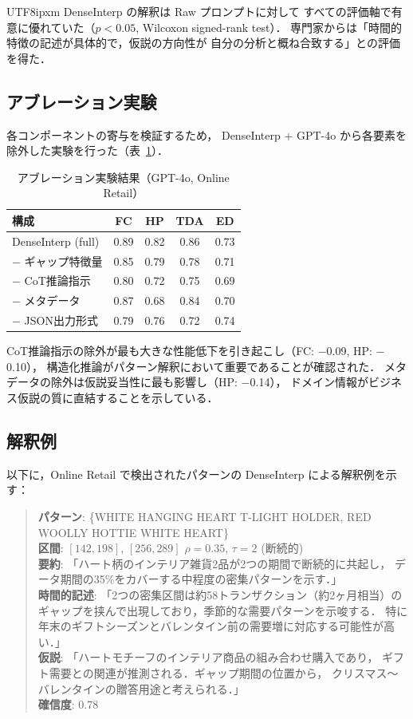 \documentclass[conference]{IEEEtran}
\begin{document}
\begin{CJK}{UTF8}{ipxm}
DenseInterp の解釈は Raw プロンプトに対して
すべての評価軸で有意に優れていた（$p < 0.05$, Wilcoxon signed-rank test）．
専門家からは「時間的特徴の記述が具体的で，仮説の方向性が
自分の分析と概ね合致する」との評価を得た．

\subsection{アブレーション実験}

各コンポーネントの寄与を検証するため，
DenseInterp + GPT-4o から各要素を除外した実験を行った（表~\ref{tab:ablation}）．

\begin{table}[t]
\centering
\caption{アブレーション実験結果（GPT-4o, Online Retail）}
\label{tab:ablation}
\begin{tabular}{lcccc}
\toprule
構成 & FC & HP & TDA & ED \\
\midrule
DenseInterp (full) & 0.89 & 0.82 & 0.86 & 0.73 \\
$-$ ギャップ特徴量 & 0.85 & 0.79 & 0.78 & 0.71 \\
$-$ CoT推論指示 & 0.80 & 0.72 & 0.75 & 0.69 \\
$-$ メタデータ & 0.87 & 0.68 & 0.84 & 0.70 \\
$-$ JSON出力形式 & 0.79 & 0.76 & 0.72 & 0.74 \\
\bottomrule
\end{tabular}
\end{table}

CoT推論指示の除外が最も大きな性能低下を引き起こし（FC: $-$0.09, HP: $-$0.10），
構造化推論がパターン解釈において重要であることが確認された．
メタデータの除外は仮説妥当性に最も影響し（HP: $-$0.14），
ドメイン情報がビジネス仮説の質に直結することを示している．

\subsection{解釈例}

以下に，Online Retail で検出されたパターンの DenseInterp による解釈例を示す：

\begin{quote}
\small
\textbf{パターン}: \{WHITE HANGING HEART T-LIGHT HOLDER,
RED WOOLLY HOTTIE WHITE HEART\} \\
\textbf{区間}: $[142, 198]$, $[256, 289]$ \quad $\rho = 0.35$, $\tau = 2$ (断続的) \\
\textbf{要約}: 「ハート柄のインテリア雑貨2品が2つの期間で断続的に共起し，
データ期間の35\%をカバーする中程度の密集パターンを示す．」\\
\textbf{時間的記述}: 「2つの密集区間は約58トランザクション（約2ヶ月相当）の
ギャップを挟んで出現しており，季節的な需要パターンを示唆する．
特に年末のギフトシーズンとバレンタイン前の需要増に対応する可能性が高い．」\\
\textbf{仮説}: 「ハートモチーフのインテリア商品の組み合わせ購入であり，
ギフト需要との関連が推測される．ギャップ期間の位置から，
クリスマス〜バレンタインの贈答用途と考えられる．」\\
\textbf{確信度}: 0.78
\end{quote}


\end{CJK}
\end{document}
